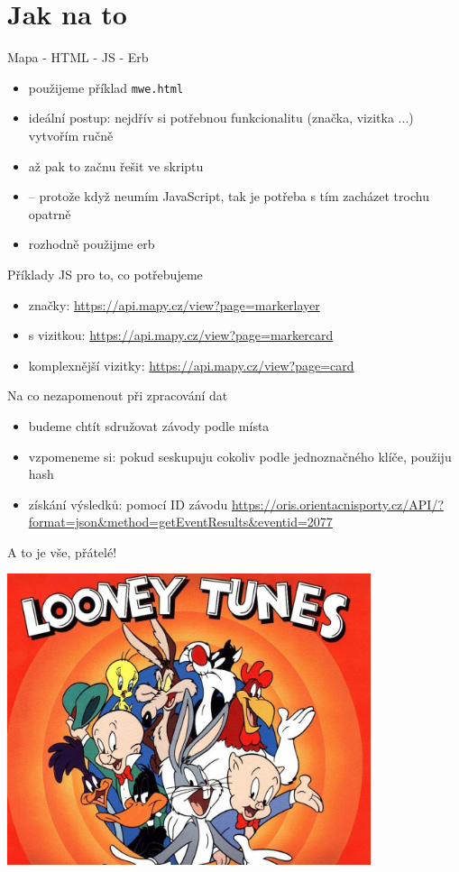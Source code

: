 \documentclass{beamer}
\begin{document}
\section{Jak na to}

\begin{frame}{Mapa - HTML - JS - Erb}
  \begin{itemize}
    \item použijeme příklad \texttt{mwe.html}
    \item ideální postup: nejdřív si potřebnou funkcionalitu (značka, vizitka ...) vytvořím ručně
    \item až pak to začnu řešit ve skriptu
    \item -- protože když neumím JavaScript, tak je potřeba s tím zacházet trochu opatrně
    \item rozhodně použijme erb
  \end{itemize}
\end{frame}

\begin{frame}{Příklady JS pro to, co potřebujeme}
  \begin{itemize}
    \item značky: \url{https://api.mapy.cz/view?page=markerlayer}
    \item s vizitkou: \url{https://api.mapy.cz/view?page=markercard}
    \item komplexnější vizitky: \url{https://api.mapy.cz/view?page=card}
  \end{itemize}
\end{frame}

\begin{frame}{Na co nezapomenout při zpracování dat}
  \begin{itemize}
    \item budeme chtít sdružovat závody podle místa
    \item vzpomeneme si: pokud seskupuju cokoliv podle jednoznačného klíče, použiju hash
    \item získání výsledků: pomocí ID závodu \url{https://oris.orientacnisporty.cz/API/?format=json&method=getEventResults&eventid=2077}
  \end{itemize}
\end{frame}

\begin{frame}{A to je vše, přátelé!}
  \begin{center}
    \includegraphics[width=0.8\textwidth]{looney_tunes}
  \end{center}
\end{frame}
\end{document}
